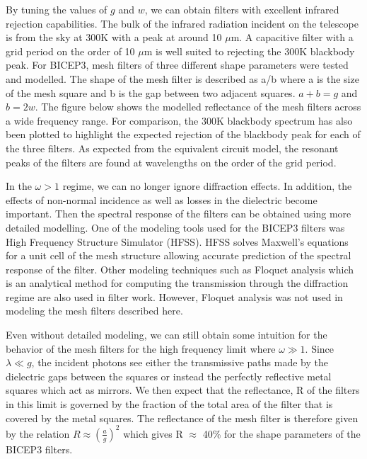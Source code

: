\documentclass[12pt]{article}
\begin{document}
By tuning the values of $g$ and $w$, we can obtain filters with excellent infrared rejection capabilities. The bulk of the infrared radiation incident on the telescope is from the sky at 300K with a peak at around 10 $\mu$m. A capacitive filter with a grid period on the order of 10 $\mu$m is well suited to rejecting the 300K blackbody peak. For BICEP3, mesh filters of three different shape parameters were tested and modelled. The shape of the mesh filter is described as a/b where a is the size of the mesh square and b is the gap between two adjacent squares. $a + b = g$ and $b = 2 w$. The figure below shows the modelled reflectance of the mesh filters across a wide frequency range. For comparison, the 300K blackbody spectrum has also been plotted to highlight the expected rejection of the blackbody peak for each of the three filters. As expected from the equivalent circuit model, the resonant peaks of the filters are found at wavelengths on the order of the grid period.

In the $\omega > 1$ regime, we can no longer ignore diffraction effects. In addition, the effects of non-normal incidence as well as losses in the dielectric become important. Then the spectral response of the filters can be obtained using more detailed modelling. One of the modeling tools used for the BICEP3 filters was High Frequency Structure Simulator (HFSS). HFSS solves Maxwell's equations for a unit cell of the mesh structure allowing accurate prediction of the spectral response of the filter. Other modeling techniques such as Floquet analysis which is an analytical method for computing the transmission through the diffraction regime are also used in filter work. However, Floquet analysis was not used in modeling the mesh filters described here.

Even without detailed modeling, we can still obtain some intuition for the behavior of the mesh filters for the high frequency limit where $\omega \gg 1$. Since $\lambda \ll g$, the incident photons see either the transmissive paths made by the dielectric gaps between the squares or instead the perfectly reflective metal squares which act as mirrors. We then expect that the reflectance, R of the filters in this limit is governed by the fraction of the total area of the filter that is covered by the metal squares. The reflectance of the mesh filter is therefore given by the relation $R \approx \left(\frac{a}{g}\right)^2$ which gives R $\approx$ 40\% for the shape parameters of the BICEP3 filters.
\end{document}
